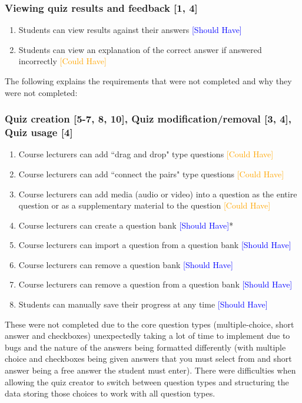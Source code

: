 \subsubsection{Viewing quiz results and feedback [1, 4]}
\begin{enumerate}
	\item Students can view results against their answers \textcolor{Blue}{[Should Have]}
	\item Students can view an explanation of the correct answer if answered incorrectly \textcolor{Orange}{[Could Have]}
\end{enumerate}

The following explains the requirements that were not completed and why they were not completed:

\subsubsection{Quiz creation [5-7, 8, 10], Quiz modification/removal [3, 4], Quiz usage [4]}
\begin{enumerate}
	\item Course lecturers can add ``drag and drop" type questions \textcolor{Orange}{[Could Have]}
	\item Course lecturers can add ``connect the pairs" type questions \textcolor{Orange}{[Could Have]}
	\item Course lecturers can add media (audio or video) into a question as the entire question or as a supplementary material to the question \textcolor{Orange}{[Could Have]}
	\item Course lecturers can create a question bank \textcolor{Blue}{[Should Have]}*
	\item Course lecturers can import a question from a question bank \textcolor{Blue}{[Should Have]}
	\item Course lecturers can remove a question bank \textcolor{Blue}{[Should Have]}
	\item Course lecturers can remove a question from a question bank \textcolor{Blue}{[Should Have]}
	\item Students can manually save their progress at any time \textcolor{Blue}{[Should Have]}
\end{enumerate}

These were not completed due to the core question types (multiple-choice, short answer and checkboxes) unexpectedly taking a lot of time to implement due to bugs and the nature of the answers being formatted differently (with multiple choice and checkboxes being given answers that you must select from and short answer being a free answer the student must enter). There were difficulties when allowing the quiz creator to switch between question types and structuring the data storing those choices to work with all question types. 

